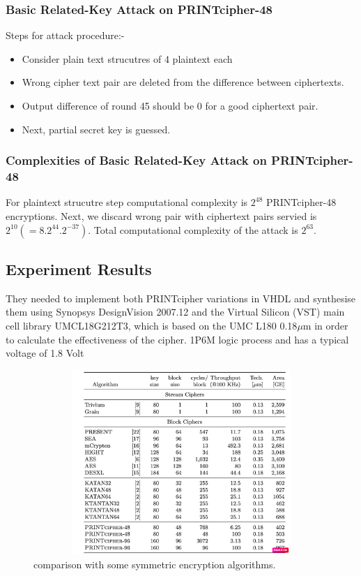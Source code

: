 \documentclass[journal=tosc,preprint]{iacrtrans}
\begin{document}
\subsubsection{Basic Related-Key Attack on PRINTcipher-48}

Steps for attack procedure:-
\begin{itemize}
	\item Consider plain text strucutres of 4 plaintext each
	\item Wrong cipher text pair are deleted from the difference between ciphertexts.
	\item Output difference of round 45 should be 0 for a good ciphertext pair.
	\item Next, partial secret key is guessed.
\end{itemize}


\subsubsection{Complexities of Basic Related-Key Attack on PRINTcipher-48}
For plaintext strucutre step computational complexity is  \(2^{48}\) PRINTcipher-48 encryptions. Next, we discard wrong pair with ciphertext pairs servied is \(2^{10}(=8.2^{44}.2^{-37})\). Total computational complexity of the attack is \(2^{63}\).

\subsection{Experiment Results}
They needed to implement both PRINTcipher variations in VHDL and synthesise them using Synopsys DesignVision 2007.12 and the Virtual Silicon (VST) main cell library UMCL18G212T3, which is based on the UMC L180 0.18$\mu$m in order to calculate the effectiveness of the cipher. 1P6M logic process and has a typical voltage of 1.8 Volt
\begin{figure}[ht]
	\centering
	\includegraphics[height=7cm, width=12cm]{pics/hardware.png}
	\caption{comparison with some symmetric encryption algorithms.}
\end{figure}
\end{document}
